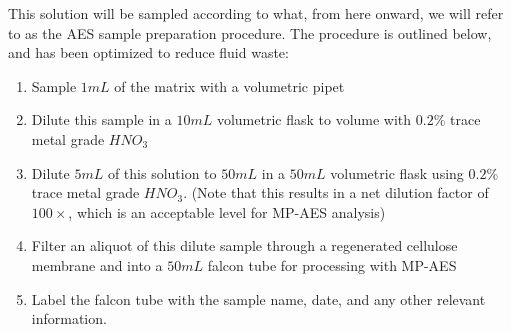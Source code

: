 \documentclass[letterpaper,12pt]{article}
\begin{document}
	\indent
	This solution will be sampled according to what, from here onward, we will refer to as the AES sample preparation procedure. The procedure is outlined below, and has been optimized to reduce fluid waste:
	\begin{enumerate}
		\item Sample $1mL$ of the matrix with a volumetric pipet
		\item Dilute this sample in a $10mL$ volumetric flask to volume with $0.2\%$ trace metal grade $HNO_3$
		\item Dilute $5mL$ of this solution to $50mL$ in a $50mL$ volumetric flask using $0.2\%$ trace metal grade $HNO_3$. (Note that this results in a net dilution factor of $100\times$, which is an acceptable level for MP-AES analysis\cite{c2})
		\item Filter an aliquot of this dilute sample through a regenerated cellulose membrane and into a $50mL$ falcon tube for processing with MP-AES
		\item Label the falcon tube with the sample name, date, and any other relevant information.
	\end{enumerate}
	
\end{document}
